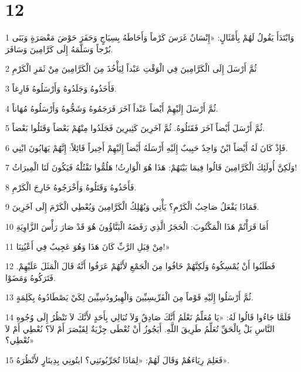 \chapter{12}

\par 1 وَابْتَدَأَ يَقُولُ لَهُمْ بِأَمْثَالٍ: «إِنْسَانٌ غَرَسَ كَرْماً وَأَحَاطَهُ بِسِيَاجٍ وَحَفَرَ حَوْضَ مَعْصَرَةٍ وَبَنَى بُرْجاً وَسَلَّمَهُ إِلَى كَرَّامِينَ وَسَافَرَ.
\par 2 ثُمَّ أَرْسَلَ إِلَى الْكَرَّامِينَ فِي الْوَقْتِ عَبْداً لِيَأْخُذَ مِنَ الْكَرَّامِينَ مِنْ ثَمَرِ الْكَرْمِ
\par 3 فَأَخَذُوهُ وَجَلَدُوهُ وَأَرْسَلُوهُ فَارِغاً.
\par 4 ثُمَّ أَرْسَلَ إِلَيْهِمْ أَيْضاً عَبْداً آخَرَ فَرَجَمُوهُ وَشَجُّوهُ وَأَرْسَلُوهُ مُهَاناً.
\par 5 ثُمَّ أَرْسَلَ أَيْضاً آخَرَ فَقَتَلُوهُ. ثُمَّ آخَرِينَ كَثِيرِينَ فَجَلَدُوا مِنْهُمْ بَعْضاً وَقَتَلُوا بَعْضاً.
\par 6 فَإِذْ كَانَ لَهُ أَيْضاً ابْنٌ وَاحِدٌ حَبِيبٌ إِلَيْهِ أَرْسَلَهُ أَيْضاً إِلَيْهِمْ أَخِيراً قَائِلاً: إِنَّهُمْ يَهَابُونَ ابْنِي.
\par 7 وَلَكِنَّ أُولَئِكَ الْكَرَّامِينَ قَالُوا فِيمَا بَيْنَهُمْ: هَذَا هُوَ الْوَارِثُ! هَلُمُّوا نَقْتُلْهُ فَيَكُونَ لَنَا الْمِيرَاثُ!
\par 8 فَأَخَذُوهُ وَقَتَلُوهُ وَأَخْرَجُوهُ خَارِجَ الْكَرْمِ.
\par 9 فَمَاذَا يَفْعَلُ صَاحِبُ الْكَرْمِ؟ يَأْتِي وَيُهْلِكُ الْكَرَّامِينَ وَيُعْطِي الْكَرْمَ إِلَى آخَرِينَ.
\par 10 أَمَا قَرَأْتُمْ هَذَا الْمَكْتُوبَ: الْحَجَرُ الَّذِي رَفَضَهُ الْبَنَّاؤُونَ هُوَ قَدْ صَارَ رَأْسَ الزَّاوِيَةِ
\par 11 مِنْ قِبَلِ الرَّبِّ كَانَ هَذَا وَهُوَ عَجِيبٌ فِي أَعْيُنِنَا!»
\par 12 فَطَلَبُوا أَنْ يُمْسِكُوهُ وَلَكِنَّهُمْ خَافُوا مِنَ الْجَمْعِ لأَنَّهُمْ عَرَفُوا أَنَّهُ قَالَ الْمَثَلَ عَلَيْهِمْ. فَتَرَكُوهُ وَمَضَوْا.
\par 13 ثُمَّ أَرْسَلُوا إِلَيْهِ قَوْماً مِنَ الْفَرِّيسِيِّينَ وَالْهِيرُودُسِيِّينَ لِكَيْ يَصْطَادُوهُ بِكَلِمَةٍ.
\par 14 فَلَمَّا جَاءُوا قَالُوا لَهُ: «يَا مُعَلِّمُ نَعْلَمُ أَنَّكَ صَادِقٌ وَلاَ تُبَالِي بِأَحَدٍ لأَنَّكَ لاَ تَنْظُرُ إِلَى وُجُوهِ النَّاسِ بَلْ بِالْحَقِّ تُعَلِّمُ طَرِيقَ اللَّهِ. أَيَجُوزُ أَنْ تُعْطَى جِزْيَةٌ لِقَيْصَرَ أَمْ لاَ؟ نُعْطِي أَمْ لاَ نُعْطِي؟»
\par 15 فَعَلِمَ رِيَاءَهُمْ وَقَالَ لَهُمْ: «لِمَاذَا تُجَرِّبُونَنِي؟ ايتُونِي بِدِينَارٍ لأَنْظُرَهُ».
